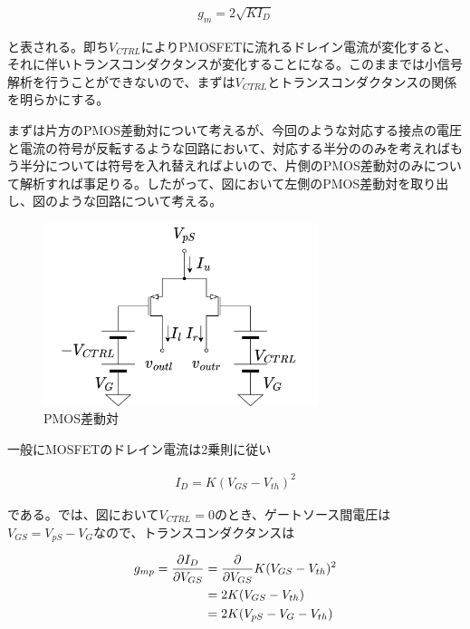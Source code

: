 \documentclass[twocolumn]{jsarticle}
\begin{document}
\begin{align}
    g_{m}=2\sqrt{KI_{D}} \label{eq:gm}
\end{align}

と表される。即ち$V_{CTRL}$によりPMOSFETに流れるドレイン電流が変化すると、それに伴いトランスコンダクタンスが変化することになる。このままでは小信号解析を行うことができないので、まずは$V_{CTRL}$とトランスコンダクタンスの関係を明らかにする。\par
まずは片方のPMOS差動対について考えるが、今回のような対応する接点の電圧と電流の符号が反転するような回路において、対応する半分ののみを考えればもう半分については符号を入れ替えればよいので、片側のPMOS差動対のみについて解析すれば事足りる。したがって、図において左側のPMOS差動対を取り出し、図のような回路について考える。

\begin{figure}[h]
    \begin{center}
        \includegraphics*[width=80mm]{figures/pmos_diff.png}
        \caption{PMOS差動対}
        \label{fig:pmos_diff}
    \end{center}
\end{figure}%

一般にMOSFETのドレイン電流は2乗則に従い

\begin{align}
    I_{D}=K(V_{GS}-V_{th})^{2}  \label{eq:square}
\end{align}

である。では、図において$V_{CTRL}=0$のとき、ゲートソース間電圧は$V_{GS}=V_{pS}-V_{G}$なので、トランスコンダクタンスは

\begin{align}
    g_{mp} = \frac{\partial I_{D}}{\partial V_{GS}} &= \frac{\partial}{\partial V_{GS}} K(V_{GS}-V_{th})^{2} \notag\\
    &=2K(V_{GS}-V_{th})    \notag\\ 
    &=2K(V_{pS}-V_{G}-V_{th})   \label{eq:g_mp}
\end{align}
\end{document}
